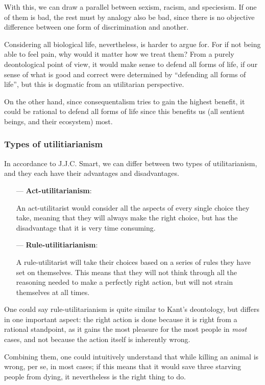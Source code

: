 \documentclass{myassignment}
\newcommand{\q}[1]{``#1''}
\begin{document}
\begin{answer}
		With this, we can draw a parallel between sexism, racism, and speciesism. If one of them is bad, the rest must by analogy also be bad, since there is no objective difference between one form of discrimination and another.

		Considering all biological life, nevertheless, is harder to argue for. For if not being able to feel pain, why would it matter how we treat them? From a purely deontological point of view, it would make sense to defend all forms of life, if our sense of what is good and correct were determined by \q{defending all forms of life}, but this is dogmatic from an utilitarian perspective. 

		On the other hand, since consequentalism tries to gain the highest benefit, it could be rational to defend all forms of life since this benefits us (all sentient beings, and their ecosystem) most.

		\subsubsection*{Types of utilitiarianism}
		In accordance to J.J.C. Smart, we can differ between two types of utilitarianism, and they each have their advantages and disadvantages. 
		\begin{itemize}
			\item[---] \textbf{Act-utilitarianism}:

				An act-utilitarist would consider all the aspects of every single choice they take, meaning that they will always make the right choice, but has the disadvantage that it is very time consuming.

			\item[---] \textbf{Rule-utilitiarianism}:

				A rule-utilitarist will take their choices based on a series of rules they have set on themselves. This means that they will not think through all the reasoning needed to make a perfectly right action, but will not strain themselves at all times.
		\end{itemize}

		One could say rule-utilitarianism is quite similar to Kant's deontology, but differs in one important aspect: the right action is done because it is right from a rational standpoint, as it gains the most pleasure for the most people in \emph{most} cases, and not because the action itself is inherently wrong.

		Combining them, one could intuitively understand that while killing an animal is wrong, per se, in most cases; if this means that it would save three starving people from dying, it nevertheless is the right thing to do.


\end{answer}
\end{document}
